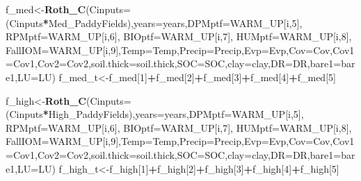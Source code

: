 \documentclass[
  10pt,
  b5paper,
]{book}
\newenvironment{Shaded}{\begin{snugshade}}{\end{snugshade}}
\newcommand{\DataTypeTok}[1]{\textcolor[rgb]{0.13,0.29,0.53}{#1}}
\newcommand{\DecValTok}[1]{\textcolor[rgb]{0.00,0.00,0.81}{#1}}
\newcommand{\KeywordTok}[1]{\textcolor[rgb]{0.13,0.29,0.53}{\textbf{#1}}}
\newcommand{\NormalTok}[1]{#1}
\newcommand{\OperatorTok}[1]{\textcolor[rgb]{0.81,0.36,0.00}{\textbf{#1}}}
\begin{document}
\begin{Shaded}
\begin{Highlighting}[]
{\NormalTok{f_med<-}\KeywordTok{Roth_C}\NormalTok{(}\DataTypeTok{Cinputs=}\NormalTok{(Cinputs}\OperatorTok{*}\NormalTok{Med_PaddyFields),}\DataTypeTok{years=}\NormalTok{years,}\DataTypeTok{DPMptf=}\NormalTok{WARM_UP[i,}\DecValTok{5}\NormalTok{], }\DataTypeTok{RPMptf=}\NormalTok{WARM_UP[i,}\DecValTok{6}\NormalTok{], }\DataTypeTok{BIOptf=}\NormalTok{WARM_UP[i,}\DecValTok{7}\NormalTok{], }\DataTypeTok{HUMptf=}\NormalTok{WARM_UP[i,}\DecValTok{8}\NormalTok{], }\DataTypeTok{FallIOM=}\NormalTok{WARM_UP[i,}\DecValTok{9}\NormalTok{],}\DataTypeTok{Temp=}\NormalTok{Temp,}\DataTypeTok{Precip=}\NormalTok{Precip,}\DataTypeTok{Evp=}\NormalTok{Evp,}\DataTypeTok{Cov=}\NormalTok{Cov,}\DataTypeTok{Cov1=}\NormalTok{Cov1,}\DataTypeTok{Cov2=}\NormalTok{Cov2,}\DataTypeTok{soil.thick=}\NormalTok{soil.thick,}\DataTypeTok{SOC=}\NormalTok{SOC,}\DataTypeTok{clay=}\NormalTok{clay,}\DataTypeTok{DR=}\NormalTok{DR,}\DataTypeTok{bare1=}\NormalTok{bare1,}\DataTypeTok{LU=}\NormalTok{LU)}
\NormalTok{f_med_t<-f_med[}\DecValTok{1}\NormalTok{]}\OperatorTok{+}\NormalTok{f_med[}\DecValTok{2}\NormalTok{]}\OperatorTok{+}\NormalTok{f_med[}\DecValTok{3}\NormalTok{]}\OperatorTok{+}\NormalTok{f_med[}\DecValTok{4}\NormalTok{]}\OperatorTok{+}\NormalTok{f_med[}\DecValTok{5}\NormalTok{]}

\NormalTok{f_high<-}\KeywordTok{Roth_C}\NormalTok{(}\DataTypeTok{Cinputs=}\NormalTok{(Cinputs}\OperatorTok{*}\NormalTok{High_PaddyFields),}\DataTypeTok{years=}\NormalTok{years,}\DataTypeTok{DPMptf=}\NormalTok{WARM_UP[i,}\DecValTok{5}\NormalTok{], }\DataTypeTok{RPMptf=}\NormalTok{WARM_UP[i,}\DecValTok{6}\NormalTok{], }\DataTypeTok{BIOptf=}\NormalTok{WARM_UP[i,}\DecValTok{7}\NormalTok{], }\DataTypeTok{HUMptf=}\NormalTok{WARM_UP[i,}\DecValTok{8}\NormalTok{], }\DataTypeTok{FallIOM=}\NormalTok{WARM_UP[i,}\DecValTok{9}\NormalTok{],}\DataTypeTok{Temp=}\NormalTok{Temp,}\DataTypeTok{Precip=}\NormalTok{Precip,}\DataTypeTok{Evp=}\NormalTok{Evp,}\DataTypeTok{Cov=}\NormalTok{Cov,}\DataTypeTok{Cov1=}\NormalTok{Cov1,}\DataTypeTok{Cov2=}\NormalTok{Cov2,}\DataTypeTok{soil.thick=}\NormalTok{soil.thick,}\DataTypeTok{SOC=}\NormalTok{SOC,}\DataTypeTok{clay=}\NormalTok{clay,}\DataTypeTok{DR=}\NormalTok{DR,}\DataTypeTok{bare1=}\NormalTok{bare1,}\DataTypeTok{LU=}\NormalTok{LU)}
\NormalTok{f_high_t<-f_high[}\DecValTok{1}\NormalTok{]}\OperatorTok{+}\NormalTok{f_high[}\DecValTok{2}\NormalTok{]}\OperatorTok{+}\NormalTok{f_high[}\DecValTok{3}\NormalTok{]}\OperatorTok{+}\NormalTok{f_high[}\DecValTok{4}\NormalTok{]}\OperatorTok{+}\NormalTok{f_high[}\DecValTok{5}\NormalTok{]}

}
\end{Highlighting}
\end{Shaded}
\end{document}
